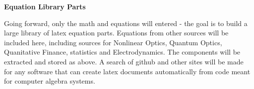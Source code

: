 \documentclass{article}
\begin{document}
\newpage

\textbf{Equation Library Parts} \newline

Going forward, only the math and equations will entered - the goal is to build a large library of latex equation parts. Equations from other sources will be included here, including sources for Nonlinear Optics, Quantum Optics, Quanitative Finance, statistics and Electrodynamics. The components will be extracted and stored as above. A search of github and other sites will be made for any software that can create latex documents automatically from code meant for computer algebra systems. \newline
\end{document}
